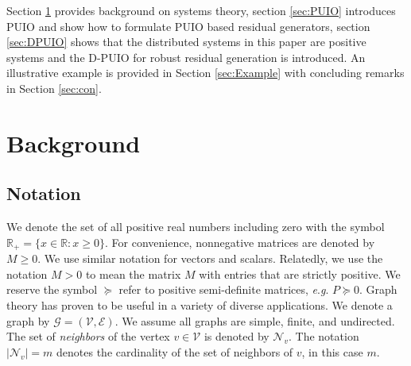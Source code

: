 \documentclass[letterpaper, 10 pt, conference]{ieeeconf}  %
\def\R{\mathbb{R}}
\def\Rp{\mathbb{R}_+}
\def\cG{\mathcal{G}}
\newcommand{\eg}{\textit{e}.\textit{g}. }
\begin{document}
Section \ref{sec:back} provides background on systems theory, section \ref{sec:PUIO} introduces PUIO and show how to formulate PUIO based residual generators, section \ref{sec:DPUIO} shows that the distributed systems in this paper are positive systems and the D-PUIO for robust residual generation is introduced. An illustrative example is provided in Section \ref{sec:Example} with concluding remarks in Section \ref{sec:con}.

\section{Background} \label{sec:back}
\subsection{Notation}
We denote the set of all positive real numbers including zero with the symbol $\Rp = \{x \in \R: x\geq 0\}$. %
For convenience, nonnegative matrices are denoted by $M \geq 0$. We use similar notation for vectors and scalars. Relatedly, we use the notation $M > 0$ to mean the matrix $M$ with entries that are strictly positive. We reserve the symbol $\succeq$ refer to positive semi-definite matrices, \eg $P \succeq 0$. 
Graph theory has proven to be useful in a variety of diverse applications. We denote a graph by $\cG = (\mathcal{V},\mathcal{E})$. We assume all graphs are simple, finite, and undirected.  The set of \textit{neighbors} of the vertex $v \in \mathcal{V}$ is denoted by $\mathcal{N}_v$. The notation $|\mathcal{N}_v|=m$ denotes the cardinality of the set of neighbors of $v$, in this case $m$. 
\end{document}
